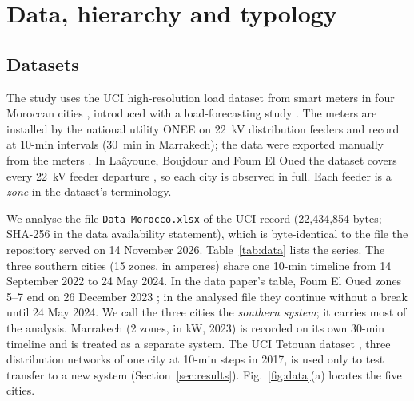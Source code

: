 \section{Data, hierarchy and typology}\label{sec:data}

\subsection{Datasets}\label{sec:datasets}

The study uses the UCI high-resolution load dataset from smart meters in four Moroccan cities \cite{bensalah2025uci,bensalah2025dib}, introduced with a load-forecasting study \cite{bensalah2025opsearch}. The meters are installed by the national utility ONEE on 22~kV distribution feeders and record at 10-min intervals (30~min in Marrakech); the data were exported manually from the meters \cite{bensalah2025dib}. In Laâyoune, Boujdour and Foum El Oued the dataset covers every 22~kV feeder departure \cite{bensalah2025dib}, so each city is observed in full. Each feeder is a \emph{zone} in the dataset's terminology.

We analyse the file \texttt{Data Morocco.xlsx} of the UCI record (22,434,854 bytes; SHA-256 in the data availability statement), which is byte-identical to the file the repository served on 14 November 2026. Table~\ref{tab:data} lists the series. The three southern cities (15 zones, in amperes) share one 10-min timeline from 14 September 2022 to 24 May 2024. In the data paper's table, Foum El Oued zones 5--7 end on 26 December 2023 \cite{bensalah2025dib}; in the analysed file they continue without a break until 24 May 2024. We call the three cities the \emph{southern system}; it carries most of the analysis. Marrakech (2 zones, in kW, 2023) is recorded on its own 30-min timeline and is treated as a separate system. The UCI Tetouan dataset \cite{salam2018uci,salam2018irsec}, three distribution networks of one city at 10-min steps in 2017, is used only to test transfer to a new system (Section~\ref{sec:results}). Fig.~\ref{fig:data}(a) locates the five cities.

